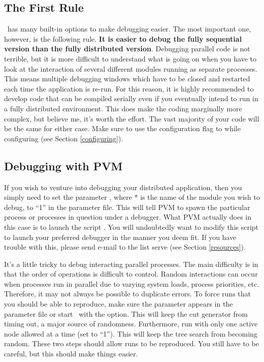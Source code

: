 \subsection{The First Rule}

\BB\ has many built-in options to make debugging easier. The most
important one, however, is the following rule. {\bf It is easier to
debug the fully sequential version than the fully distributed
version}. Debugging parallel code is not terrible, but it is more
difficult to understand what is going on when you have to look at the
interaction of several different modules running as separate
processes. This means multiple debugging windows which have to be
closed and restarted each time the application is re-run. For this
reason, it is highly recommended to develop code that can be compiled
serially even if you eventually intend to run in a fully distributed
environment. This does make the coding marginally more complex, but
believe me, it's worth the effort. The vast majority of your code will
be the same for either case. Make sure to use the configuration flag to
 while configuring (see Section \ref{configuring}). 

\subsection{Debugging with PVM}
\label{debugging-PVM}
If you wish to venture into debugging your distributed application, then you
simply need to set the parameter , where * is the name of the
module you wish to debug, to ``1'' in the parameter file. This will tell PVM
to spawn the particular process or processes in question under a debugger.
What PVM actually does in this case is to launch the script
. You will undoubtedly want to modify this
script to launch your preferred debugger in the manner you deem fit. If you
have trouble with this, please send e-mail to the list serve (see Section
\ref{resources}).

It's a little tricky to debug interacting parallel processes. The main
difficulty is in that the order of operations is difficult to control. Random
interactions can occur when processes run in parallel due to varying system
loads, process priorities, etc. Therefore, it may not always be possible to
duplicate errors. To force runs that you should be able to reproduce, make
sure the parameter  appears in the parameter file or
start \BB\ with the  option. This will keep the cut generator from
timing out, a major source of randomness. Furthermore, run with only one
active node allowed at a time (set  to ``1''). This
will keep the tree search from becoming random. These two steps should allow
runs to be reproduced. You still have to be careful, but this should make
things easier.

